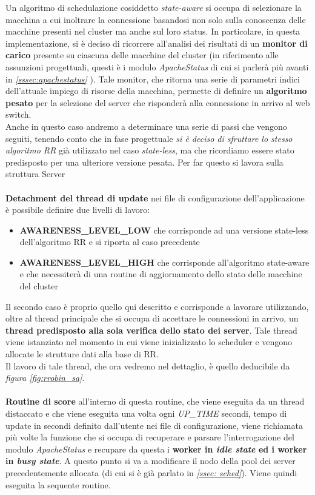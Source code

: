 \documentclass[italian]{tktltiki2}
\begin{document}
Un algoritmo di schedulazione cosiddetto \emph{state-aware} si occupa di selezionare la macchina a cui inoltrare la connessione basandosi non solo sulla conoscenza delle macchine presenti nel cluster ma anche sul loro status. In particolare, in questa implementazione, si è deciso di ricorrere all'analisi dei risultati di un \textbf{monitor di carico} presente su ciascuna delle macchine del cluster (in riferimento alle assunzioni progettuali, questi è i modulo \emph{ApacheStatus} di cui si parlerà più avanti in \emph{\ref{sssec:apachestatus}} ). Tale monitor, che ritorna una serie di parametri indici dell'attuale impiego di risorse della macchina, permette di definire un \textbf{algoritmo pesato} per la selezione del server che risponderà alla connessione in arrivo al web switch. \\
Anche in questo caso andremo a determinare una serie di passi che vengono seguiti, tenendo conto che in fase progettuale \emph{si è deciso di sfruttare lo stesso algoritmo RR} già utilizzato nel caso \emph{state-less}, ma che ricordiamo essere stato predisposto per una ulteriore versione pesata. Per far questo si lavora sulla struttura Server 
\\
\\
\textbf{Detachment del thread di update} nei file di configurazione dell'applicazione è possibile definire due livelli di lavoro:
  \begin{itemize}
    \item \textbf{AWARENESS\_LEVEL\_LOW} che corrisponde ad una versione state-less dell'algoritmo RR e si riporta al caso precedente
    \item \textbf{AWARENESS\_LEVEL\_HIGH} che corrisponde all'algoritmo state-aware e che necessiterà di una routine di aggiornamento dello stato delle macchine del cluster
  \end{itemize}
  Il secondo caso è proprio quello qui descritto e corrisponde a lavorare utilizzando, oltre al thread principale che si occupa di accettare le connessioni in arrivo, un \textbf{thread predisposto alla sola verifica dello stato dei server}. Tale thread viene istanziato nel momento in cui viene inizializzato lo scheduler e vengono allocate le strutture dati alla base di RR. 
  \\
  Il lavoro di tale thread, che ora vedremo nel dettaglio, è quello deducibile da \emph{figura \ref{fig:rrobin_sa}}.
  \\
  \\
\textbf{Routine di score} all'interno di questa routine, che viene eseguita da un thread distaccato e che viene eseguita una volta ogni \emph{UP\_TIME} secondi, tempo di update in secondi definito dall'utente nei file di configurazione, viene richiamata più volte la funzione che si occupa di recuperare e parsare l'interrogazione del modulo \emph{ApacheStatus} e recupare da questa i \textbf{worker in \emph{idle state} ed i worker in \emph{busy state}}. A questo punto si va a modificare il nodo della pool dei server precedentemente allocata (di cui si è già parlato in \emph{\ref{ssec: sched}}). Viene quindi eseguita la sequente routine. 
\end{document}
